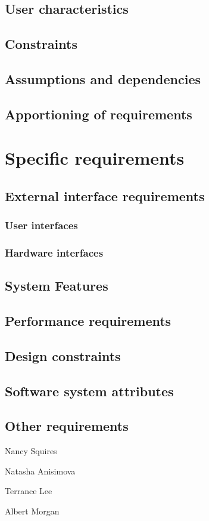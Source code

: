 \documentclass[10pt,journal,draftclsnofoot,onecolumn]{IEEEtran}
\begin{document}
	\subsection{User characteristics}
	\subsection{Constraints}
	\subsection{Assumptions and dependencies}
	\subsection{Apportioning of requirements}
	
	\section{Specific requirements}
	
	\subsection{External interface requirements}
	\subsubsection{User interfaces}
	\subsubsection{Hardware interfaces}

	\subsection{System Features}	
	\subsection{Performance requirements}
	\subsection{Design constraints}
	\subsection{Software system attributes}
	\subsection{Other requirements}




	\vspace{1in}
	\noindent Nancy Squires

	\vspace{1in}
	\noindent Natasha Anisimova

	\vspace{1in}
	\noindent Terrance Lee

	\vspace{1in}
	\noindent Albert Morgan\\
	
\end{document}
